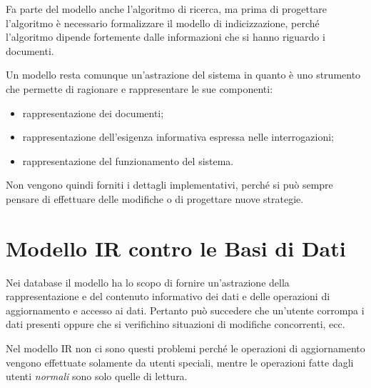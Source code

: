 Fa parte del modello anche l'algoritmo di ricerca, ma prima di progettare l'algoritmo è necessario formalizzare il modello di indicizzazione, perché l'algoritmo dipende fortemente dalle informazioni che si hanno riguardo i documenti.

Un modello resta comunque un'astrazione del sistema in quanto è uno strumento che permette di ragionare e rappresentare le sue componenti:

\begin{itemize}
	\item rappresentazione dei documenti;
	\item rappresentazione dell'esigenza informativa espressa nelle interrogazioni;
	\item rappresentazione del funzionamento del sistema.
\end{itemize}

\noindent Non vengono quindi forniti i dettagli implementativi, perché si può sempre pensare di effettuare delle modifiche o di progettare nuove strategie.

\section{Modello IR contro le Basi di Dati}

Nei database il modello ha lo scopo di fornire un'astrazione della rappresentazione e del contenuto informativo dei dati e delle operazioni di aggiornamento e accesso ai dati.
Pertanto può succedere che un'utente corrompa i dati presenti oppure che si verifichino situazioni di modifiche concorrenti, ecc.

Nel modello IR non ci sono questi problemi perché le operazioni di aggiornamento vengono effettuate solamente da utenti speciali, mentre le operazioni fatte dagli utenti \textit{normali} sono solo quelle di lettura.

